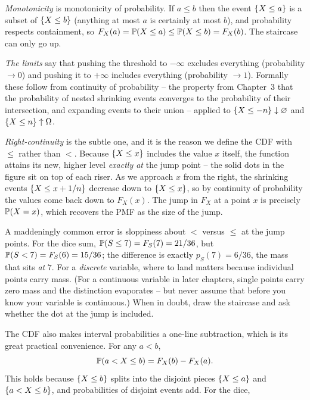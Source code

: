 \begin{whybox}
\emph{Monotonicity} is monotonicity of probability. If $a \le b$ then the event
$\set{X \le a}$ is a subset of $\set{X \le b}$ (anything at most $a$ is certainly at
most $b$), and probability respects containment, so
$F_X(a) = \P(X \le a) \le \P(X \le b) = F_X(b)$. The staircase can only go up.

\emph{The limits} say that pushing the threshold to $-\infty$ excludes everything
(probability $\to 0$) and pushing it to $+\infty$ includes everything (probability
$\to 1$). Formally these follow from continuity of probability -- the property from
Chapter~3 that the probability of nested shrinking events converges to the probability
of their intersection, and expanding events to their union -- applied to
$\set{X \le -n}\downarrow \varnothing$ and $\set{X \le n}\uparrow \Omega$.

\emph{Right-continuity} is the subtle one, and it is the reason we define the CDF with
$\le$ rather than $<$. Because $\set{X \le x}$ includes the value $x$ itself, the
function attains its new, higher level \emph{exactly at} the jump point -- the solid
dots in the figure sit on top of each riser. As we approach $x$ from the right, the
shrinking events $\set{X \le x + 1/n}$ decrease down to $\set{X \le x}$, so by
continuity of probability the values come back down to $F_X(x)$. The jump in $F_X$ at a
point $x$ is precisely $\P(X = x)$, which recovers the PMF as the size of the jump.
\end{whybox}

\begin{trapbox}
A maddeningly common error is sloppiness about $<$ versus $\le$ at the jump points.
For the dice sum, $\P(S \le 7) = F_S(7) = 21/36$, but $\P(S < 7) = F_S(6) = 15/36$;
the difference is exactly $p_S(7) = 6/36$, the mass that sits \emph{at} $7$. For a
\emph{discrete} variable, where to land matters because individual points carry mass.
(For a continuous variable in later chapters, single points carry zero mass and the
distinction evaporates -- but never assume that before you know your variable is
continuous.) When in doubt, draw the staircase and ask whether the dot at the jump is
included.
\end{trapbox}

The CDF also makes interval probabilities a one-line subtraction, which is its great
practical convenience. For any $a < b$,
\[
  \P(a < X \le b) = F_X(b) - F_X(a).
\]
This holds because $\set{X \le b}$ splits into the disjoint pieces $\set{X \le a}$ and
$\set{a < X \le b}$, and probabilities of disjoint events add. For the dice,

